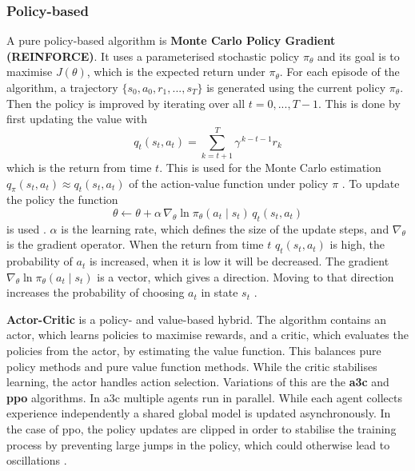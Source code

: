 \subsubsection{Policy-based}
A pure policy-based algorithm is \textbf{Monte Carlo Policy Gradient (REINFORCE)}. It uses a parameterised stochastic policy $\pi_\theta$ and its goal is to maximise $J(\theta)$, which is the expected return under $\pi_\theta$. For each episode of the algorithm, a trajectory $\{s_0,a_0,r_1,...,s_T\}$ is generated using the current policy $\pi_\theta$. Then the policy is improved by iterating over all $t=0,...,T-1$. This is done by first updating the value with 
\[
    q_t(s_t, a_t) = \sum_{k=t+1}^{T} \gamma^{\,k-t-1} r_k
\]
which is the return from time $t$. This is used for the Monte Carlo estimation $q_\pi(s_t,a_t) \approx q_t(s_t, a_t)$ of the action-value function under policy $\pi$ \cite{foundationsRL}. To update the policy the function
\[
\theta \leftarrow \theta + \alpha \, \nabla_\theta \ln \pi_\theta(a_t \mid s_t)\, q_t(s_t, a_t)
\]
is used \cite{foundationsRL}. $\alpha$ is the learning rate, which defines the size of the update steps, and $\nabla_\theta$ is the gradient operator. When the return from time $t$ $q_t(s_t, a_t)$ is high, the probability of $a_t$ is increased, when it is low it will be decreased. The gradient $\nabla_\theta \ln \pi_\theta(a_t \mid s_t)$ is a vector, which gives a direction. Moving to that direction increases the probability of choosing $a_t$ in state $s_t$ \cite{rl_introduction}.

\textbf{Actor-Critic} is a policy- and value-based hybrid. The algorithm contains an actor, which learns policies to maximise rewards, and a critic, which evaluates the policies from the actor, by estimating the value function. This balances pure policy methods and pure value function methods. While the critic stabilises learning, the actor handles action selection. Variations of this are the \textbf{\ac{a3c}} and \textbf{\ac{ppo}} algorithms. In \ac{a3c} multiple agents run in parallel. While each agent collects experience independently a shared global model is updated asynchronously. In the case of \ac{ppo}, the policy updates are clipped in order to stabilise the training process by preventing large jumps in the policy, which could otherwise lead to oscillations \cite{grl4powergrids}.



